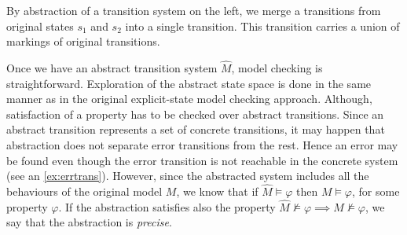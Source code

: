 \begin{example} \label{ex:errtrans}
By abstraction of a transition system on the left, we merge a transitions from
original states $s_1$ and $s_2$ into a single transition. This transition
carries a union of markings of original transitions.
\begin{center}
\end{center}
\end{example}


Once we have an abstract transition system $\widehat{M}$, model checking is
straightforward. Exploration of the abstract state space is done in the same manner
as in the original explicit-state model checking approach. Although, satisfaction of
a property has to be checked over abstract transitions. Since an abstract transition
represents a set of concrete transitions, it may happen that abstraction does not
separate error transitions from the rest. Hence an error may be found even
though the error transition is not reachable in the concrete system (see an \autoref{ex:errtrans}). However,
since the abstracted system includes all the behaviours of the original model $M$, we know that if $\widehat{M}
\models \varphi$ then $M \models \varphi$, for some property $\varphi$. If the
abstraction satisfies also the property $\widehat{M} \not\models \varphi
\implies M \not\models \varphi$, we say that the abstraction is
\emph{precise}.
